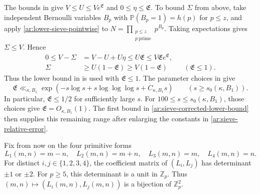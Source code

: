 \documentclass[twoside]{aomart}
\theoremstyle{paperplain}
\theoremstyle{paperdefinition}
\newcommand{\Z}{\mathbb Z}
\newcommand{\Pp}{\mathbb P}
\numberwithin{equation}{section}
\begin{document}
The bounds in \cite[(2.5)--(2.6), p.~17, and p.~31]{FordSieve2023}
give $V\le U\le Ve^{\mathfrak E}$ and $0\le\eta\le\mathfrak E$.
To bound $\Sigma$ from above, take independent Bernoulli variables
$B_p$ with $\Pp(B_p=1)=h(p)$ for $p\le z$, and apply
\eqref{ar:lower-sieve-pointwise} to $\displaystyle N=\prod_{\substack{p\le z\\p\ \mathrm{prime}}}p^{B_p}$.
Taking expectations gives $\Sigma\le V$. Hence
\begin{equation}
 \begin{aligned}
 0\le V-\Sigma&=V-U+U\eta\le U\mathfrak E
                      \le V\mathfrak E e^{\mathfrak E},\\
 \Sigma&\ge U(1-\mathfrak E)\ge V(1-\mathfrak E)
                    &&(\mathfrak E\le1).
 \end{aligned}
 \label{ar:sieve-corrected-lower-bound}
\end{equation}
Thus the lower bound in \cite[(3.4), p.~31]{FordSieve2023}
is used with $\mathfrak E\le1$.
The parameter choices in \cite[(3.11), pp.~38--39]{FordSieve2023}
give
\begin{equation}
 \mathfrak E\ll_{\kappa,B_1}
 \exp\!\left(-s\log s+s\log\log\log s+C_{\kappa,B_1}s\right)
 \qquad(s\ge s_0(\kappa,B_1)).
 \label{ar:sieve-construction-decay}
\end{equation}
In particular, $\mathfrak E\le1/2$ for sufficiently large $s$.
For $100\le s\le s_0(\kappa,B_1)$, those choices give
$\mathfrak E=O_{\kappa,B_1}(1)$.
The first bound in \eqref{ar:sieve-corrected-lower-bound}
then supplies this remaining range after enlarging the constants
in \eqref{ar:sieve-relative-error}.


Fix from now on the four primitive forms
\begin{equation}
 L_1(m,n)=m-n,\quad L_2(m,n)=m+n,\quad
 L_3(m,n)=m,\quad L_4(m,n)=n.
 \label{ar:four-forms}
\end{equation}
For distinct $i,j\in\{1,2,3,4\}$, the coefficient matrix of
$(L_i,L_j)$ has determinant $\pm1$ or $\pm2$.
For $p\ge5$, this determinant is a unit in $\Z_p$.
Thus $(m,n)\mapsto(L_i(m,n),L_j(m,n))$ is a bijection of $\Z_p^2$.
\end{document}
